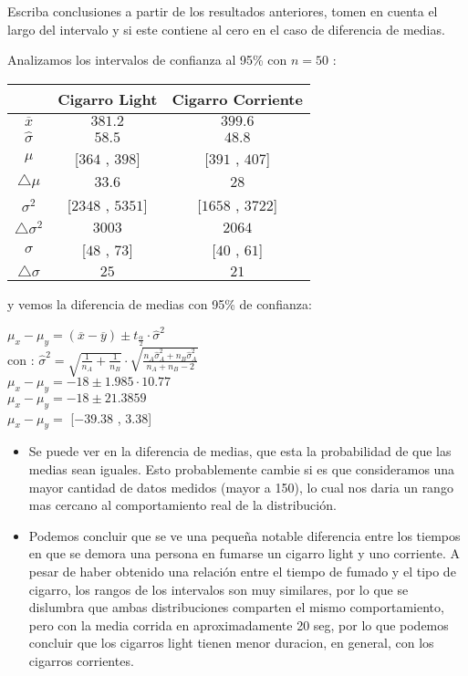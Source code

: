 Escriba conclusiones a partir de los resultados anteriores, tomen en cuenta el largo del intervalo y si
este contiene al cero en el caso de diferencia de medias.

Analizamos los intervalos de confianza al 95\% con $n=50$ :

        \begin{tabular}{|c|c|c|}\hline
		
	 & Cigarro Light & Cigarro Corriente\\\hline
	$\overline{x}$ & $381.2$ & $399.6$ \\\hline
	$\widehat{\sigma}$ & $58.5$ & $48.8$  \\\hline
	$\mu$ & [$364$ , $398$] & [$391$ , $407$] \\\hline
	$\bigtriangleup\mu$ & $33.6$ & $28$ \\\hline
	$\sigma^2$& [$2348$ , $5351$]  & [$1658$ , $3722$]  \\\hline
	$\bigtriangleup\sigma^2$& $3003$ & $2064$ \\\hline
	$\sigma$& [$48$ , $73$]  & [$40$ , $61$]  \\\hline
	$\bigtriangleup\sigma$& $25$  & $21$ \\\hline
	\end{tabular}

y vemos la diferencia de medias con 95\% de confianza:

$\mu_x - \mu_y = (\overline{x} - \overline{y}) \pm t_{\frac{\alpha}{2}} \cdot \widehat{\sigma}^2$\\
con : $\widehat{\sigma}^2 = \sqrt{\frac{1}{n_A}+\frac{1}{n_B}}\cdot\sqrt{\frac{n_A \widehat{\sigma}_{A}^{2} + n_B \widehat{\sigma}_{A}^{2}  }{n_A + n_B - 2}}$\\
$\mu_x - \mu_y = -18 \pm 1.985 \cdot 10.77$\\
$\mu_x - \mu_y = -18 \pm 21.3859$\\
$\mu_x - \mu_y =$ [$-39.38$ , $3.38$]\\

\begin{itemize}
	\item Se puede ver en la diferencia de medias, que esta la probabilidad de que las medias sean iguales. Esto probablemente cambie si es que consideramos una mayor cantidad de datos medidos (mayor a 150), lo cual nos daria un rango mas cercano al comportamiento real de la distribuci\'on.
	\item Podemos concluir que se ve una peque\~na notable diferencia entre los tiempos en que se demora una persona en fumarse un cigarro light y uno corriente. 
	A pesar de haber obtenido una relaci\'on entre el tiempo de fumado y el tipo de cigarro, los rangos de los intervalos son muy similares, por lo que se dislumbra que ambas distribuciones comparten el mismo comportamiento, pero con la media corrida en aproximadamente 20 seg, por lo que podemos concluir que los cigarros light tienen menor duracion, en general, con los cigarros corrientes.
\end{itemize}

